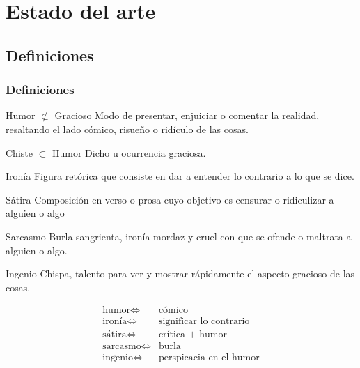 \section{Estado del arte}

\subsection{Definiciones}
\begin{frame}[allowframebreaks]
    \frametitle{Definiciones}

    \begin{block}{Humor $\not\subset$ Gracioso}
        Modo de presentar, enjuiciar o comentar la realidad, resaltando el lado cómico, risueño o ridículo de las cosas.  
    \end{block}
    \begin{block}{Chiste $\subset$ Humor}
        Dicho u ocurrencia graciosa.
    \end{block}

    \framebreak

    \begin{block}{Ironía}
        Figura retórica que consiste en dar a entender lo contrario a lo que se dice.
    \end{block}
    \begin{block}{Sátira}
        Composición en verso o prosa cuyo objetivo es censurar o ridiculizar a alguien o algo
    \end{block}
    \begin{block}{Sarcasmo}
        Burla sangrienta, ironía mordaz y cruel con que se ofende o maltrata a alguien o algo.
    \end{block}
    \begin{block}{Ingenio}
        Chispa, talento para ver y mostrar rápidamente el aspecto gracioso de las cosas.
    \end{block}

    \framebreak
        
    \begin{eqnarray*} %
        \text{humor} \iff&  \text{cómico} \\
        \text{ironía} \iff& \text{significar lo contrario} \\
        \text{sátira} \iff& \text{crítica + humor} \\
        \text{sarcasmo} \iff& \text{burla} \\
        \text{ingenio}  \iff& \text{perspicacia en el humor}
    \end{eqnarray*}
\end{frame}

